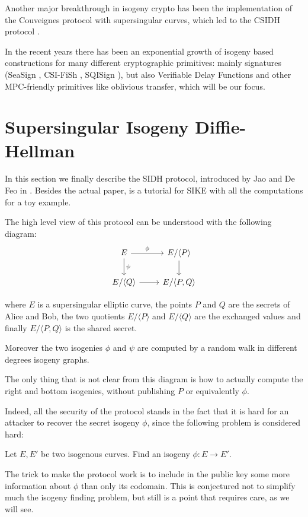 Another major breakthrough in isogeny crypto has been the implementation of the Couveignes protocol with supersingular curves, which led to the CSIDH protocol \cite{CSIDH}.

In the recent years there has been an exponential growth of isogeny based constructions for many different cryptographic primitives: mainly signatures (SeaSign \cite{SeaSign}, CSI-FiSh \cite{CSI-FiSh}, SQISign \cite{SQISign}), but also Verifiable Delay Functions \cite{DeFeo_VDF} and other MPC-friendly primitives like oblivious transfer, which will be our focus.

\section{Supersingular Isogeny Diffie-Hellman}
In this section we finally describe the SIDH protocol, introduced by Jao and De Feo in \cite{SIDH11}. Besides the actual paper, \cite{Costello_SIKE} is a tutorial for SIKE with all the computations for a toy example.

The high level view of this protocol can be understood with the following diagram:
\[\begin{tikzcd}
E \rar["\phi"] \dar["\psi"] & E/\langle P\rangle \dar\\
E/\langle Q\rangle \rar & E/\langle P, Q\rangle
\end{tikzcd}\]

where $E$ is a supersingular elliptic curve, the points $P$ and $Q$ are the secrets of Alice and Bob, the two quotients $E/\langle P\rangle$ and $E/\langle Q\rangle$ are the exchanged values and finally $E/\langle P, Q\rangle$ is the shared secret.

Moreover the two isogenies $\phi$ and $\psi$ are computed by a random walk in different degrees isogeny graphs.

The only thing that is not clear from this diagram is how to actually compute the right and bottom isogenies, without publishing $P$ or equivalently $\phi$.

Indeed, all the security of the protocol stands in the fact that it is hard for an attacker to recover the secret isogeny $\phi$, since the following problem is considered hard:
\begin{problem}
    Let $E,E'$ be two isogenous curves. Find an isogeny $\phi: E\to E'$.
\end{problem}

The trick to make the protocol work is to include in the public key some more information about $\phi$ than only its codomain. This is conjectured not to simplify much the isogeny finding problem, but still is a point that requires care, as we will see.

